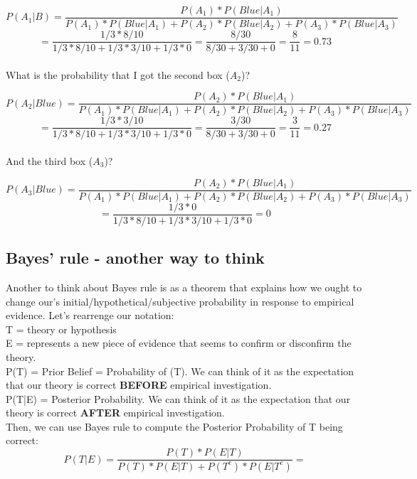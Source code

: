 \documentclass[11pt]{article}
\begin{document}
	\[P(A_1|B) = \frac{P(A_1)*P(Blue|A_1)}{P(A_1)*P(Blue|A_1)+P(A_2)*P(Blue|A_2)+P(A_3)*P(Blue|A_3)}\]
	\[= \frac{1/3*8/10}{1/3*8/10+1/3*3/10+1/3*0} = \frac{8/30}{8/30+3/30+0} = \frac{8}{11} = 0.73\]\\

	What is the probability that I got the second box ($A_2$)?
	
	\[P(A_2|Blue) = \frac{P(A_2)*P(Blue|A_1)}{P(A_1)*P(Blue|A_1)+P(A_2)*P(Blue|A_2)+P(A_3)*P(Blue|A_3)}\]
	\[= \frac{1/3*3/10}{1/3*8/10+1/3*3/10+1/3*0} = \frac{3/30}{8/30+3/30+0} = \frac{3}{11} = 0.27\]\\

	And the third box ($A_3$)?

	\[P(A_3|Blue) = \frac{P(A_2)*P(Blue|A_1)}{P(A_1)*P(Blue|A_1)+P(A_2)*P(Blue|A_2)+P(A_3)*P(Blue|A_3)}\]
	\[= \frac{1/3*0}{1/3*8/10+1/3*3/10+1/3*0} = 0\] 


	\subsection*{Bayes' rule - another way to think}
	Another to think about Bayes rule is as	a theorem that explains how we ought to change our’s initial/hypothetical/subjective probability in response to empirical evidence. Let's rearrenge our notation:\\
	
	T = theory or hypothesis \\

	E = represents a new piece of evidence that seems to confirm or disconfirm the theory.\\
	
	P(T) =  Prior Belief = Probability of (T). We can think of it as the expectation that our theory is correct \textbf{BEFORE} empirical investigation.\\
	
	P(T|E) = Posterior Probability. We can think of it as the expectation that our theory is correct \textbf{AFTER} empirical investigation.\\
	
	Then, we can use Bayes rule to compute the Posterior Probability of T being correct:\\
	
	\[P(T|E) = \frac{P(T)*P(E|T)}{P(T)*P(E|T)+P(T^c)*P(E|T^c)}=\]
\end{document}
